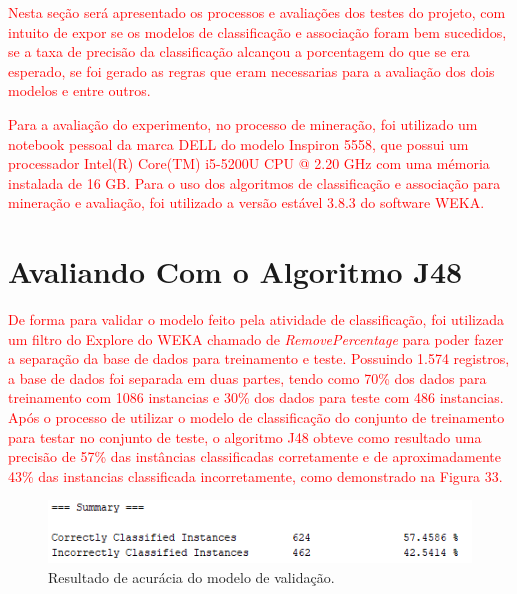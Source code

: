 \label{chapter:Avaliacao}

\par
\textcolor{red}{Nesta seção será apresentado os processos e avaliações dos testes do projeto, com intuito de expor se os modelos de classificação e associação foram bem sucedidos, se a taxa de precisão da classificação alcançou a porcentagem do que se era esperado, se foi gerado as regras que eram necessarias para a avaliação dos dois modelos e entre outros.}

\par
\textcolor{red}{Para a avaliação do experimento, no processo de mineração, foi utilizado um notebook pessoal da marca DELL do modelo Inspiron 5558, que possui um processador Intel(R) Core(TM) i5-5200U CPU @ 2.20 GHz com uma mémoria instalada de 16 GB. Para o uso dos algoritmos de classificação e associação para mineração e avaliação, foi utilizado a versão estável 3.8.3 do software WEKA.}

\section{Avaliando Com o Algoritmo J48}

\par
\textcolor{red}{De forma para validar o modelo feito pela atividade de classificação, foi utilizada um filtro do Explore do WEKA chamado de \textit{RemovePercentage} para poder fazer a separação da base de dados para treinamento e teste. Possuindo 1.574 registros, a base de dados foi separada em duas partes, tendo como 70\% dos dados para treinamento com 1086 instancias e 30\% dos dados para teste com 486 instancias. Após o processo de utilizar o modelo de classificação do conjunto de treinamento para testar no conjunto de teste, o algoritmo J48 obteve como resultado uma precisão de 57\% das instâncias classificadas corretamente e de aproximadamente 43\% das instancias classificada incorretamente, como demonstrado na Figura 33.}

\par
\begin{figure}[!htp]
	\begin{center}
    \caption{\label{fig:waveform_fig} Resultado de acurácia do modelo de validação.}
	\includegraphics[scale=0.99]{Figuras/Modelo_de_validacao.png}
	\end{center}
\end{figure}

